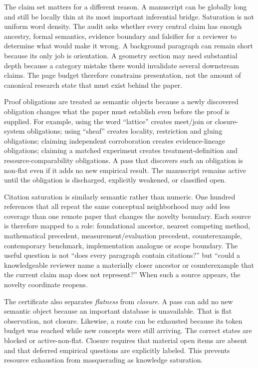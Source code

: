 The claim set matters for a different reason. A manuscript can be globally long and still be locally thin at its most important inferential bridge. Saturation is not uniform word density. The audit asks whether every central claim has enough ancestry, formal semantics, evidence boundary and falsifier for a reviewer to determine what would make it wrong. A background paragraph can remain short because its only job is orientation. A geometry section may need substantial depth because a category mistake there would invalidate several downstream claims. The page budget therefore constrains presentation, not the amount of canonical research state that must exist behind the paper.

Proof obligations are treated as semantic objects because a newly discovered obligation changes what the paper must establish even before the proof is supplied. For example, using the word ``lattice'' creates meet/join or closure-system obligations; using ``sheaf'' creates locality, restriction and gluing obligations; claiming independent corroboration creates evidence-lineage obligations; claiming a matched experiment creates treatment-definition and resource-comparability obligations. A pass that discovers such an obligation is non-flat even if it adds no new empirical result. The manuscript remains active until the obligation is discharged, explicitly weakened, or classified open.

Citation saturation is similarly semantic rather than numeric. One hundred references that all repeat the same conceptual neighborhood may add less coverage than one remote paper that changes the novelty boundary. Each source is therefore mapped to a role: foundational ancestor, nearest competing method, mathematical precedent, measurement/evaluation precedent, counterexample, contemporary benchmark, implementation analogue or scope boundary. The useful question is not ``does every paragraph contain citations?'' but ``could a knowledgeable reviewer name a materially closer ancestor or counterexample that the current claim map does not represent?'' When such a source appears, the novelty coordinate reopens.

The certificate also separates \emph{flatness} from \emph{closure}. A pass can add no new semantic object because an important database is unavailable. That is flat observation, not closure. Likewise, a route can be exhausted because its token budget was reached while new concepts were still arriving. The correct states are blocked or active-non-flat. Closure requires that material open items are absent and that deferred empirical questions are explicitly labeled. This prevents resource exhaustion from masquerading as knowledge saturation.

